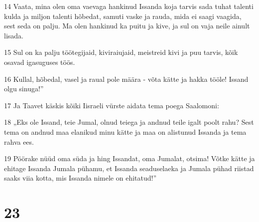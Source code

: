 \par 14 Vaata, mina olen oma vaevaga hankinud Issanda koja tarvis sada tuhat talenti kulda ja miljon talenti hõbedat, samuti vaske ja rauda, mida ei saagi vaagida, sest seda on palju. Ma olen hankinud ka puitu ja kive, ja sul on vaja neile ainult lisada.
\par 15 Sul on ka palju töötegijaid, kiviraiujaid, meistreid kivi ja puu tarvis, kõik osavad igasuguses töös.
\par 16 Kullal, hõbedal, vasel ja raual pole määra - võta kätte ja hakka tööle! Issand olgu sinuga!”
\par 17 Ja Taavet käskis kõiki Iisraeli vürste aidata tema poega Saalomoni:
\par 18 „Eks ole Issand, teie Jumal, olnud teiega ja andnud teile igalt poolt rahu? Sest tema on andnud maa elanikud minu kätte ja maa on alistunud Issanda ja tema rahva ees.
\par 19 Pöörake nüüd oma süda ja hing Issandat, oma Jumalat, otsima! Võtke kätte ja ehitage Issanda Jumala pühamu, et Issanda seaduselaeka ja Jumala pühad riistad saaks viia kotta, mis Issanda nimele on ehitatud!”

\chapter{23}

